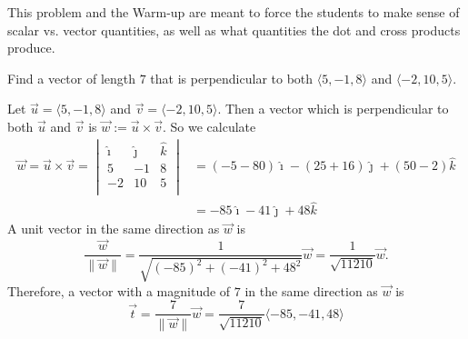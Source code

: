\documentclass[]{ximera}
\begin{document}
\begin{instructorNotes}
This problem and the Warm-up are meant to force the students to make sense of scalar vs. vector quantities, as well as what quantities the dot and cross products produce.
\end{instructorNotes}







\begin{problem}
Find a vector of length $7$ that is perpendicular to both $\langle 5,-1,8 \rangle$ and $\langle -2,10,5 \rangle$.  
	\begin{freeResponse}
	Let $\vec{u} = \langle 5,-1,8 \rangle$ and $\vec{v} = \langle -2,10,5 \rangle$.
	Then a vector which is perpendicular to both $\vec{u}$ and $\vec{v}$ is $\vec{w} := \vec{u} \times \vec{v}$.  
	So we calculate
		\begin{align*}
		\vec{w} = \vec{u} \times \vec{v} = 
		\begin{vmatrix}
		\hat{\imath}	&	\hat{\jmath}	&	\hat{k}	\\
		5		&	-1		&	8		\\
		-2		&	10		&	5		\\
		\end{vmatrix}
		&= (-5 - 80) \hat{\imath} - (25 + 16) \hat{\jmath} + (50 - 2) \hat{k}  \\
		&= -85 \hat{\imath} -41 \hat{\jmath} + 48 \hat{k}
		\end{align*}
	A unit vector in the same direction as $\vec{w}$ is
		\[
		\frac{\vec{w}}{\| \vec{w} \|}
		= \frac{1}{\sqrt{(-85)^2 + (-41)^2 + 48^2}} \vec{w} = \frac{1}{\sqrt{11210}} \vec{w}.
		\]
	Therefore, a vector with a magnitude of $7$ in the same direction as $\vec{w}$ is
		\[
		\vec{t} = \frac{7}{\| \vec{w} \|} \vec{w} = \boxed{\frac{7}{\sqrt{11210}} \langle -85,-41,48 \rangle}
		\]
	\end{freeResponse}
		
\end{problem}

\begin{instructorNotes}

\end{instructorNotes}
\end{document}
